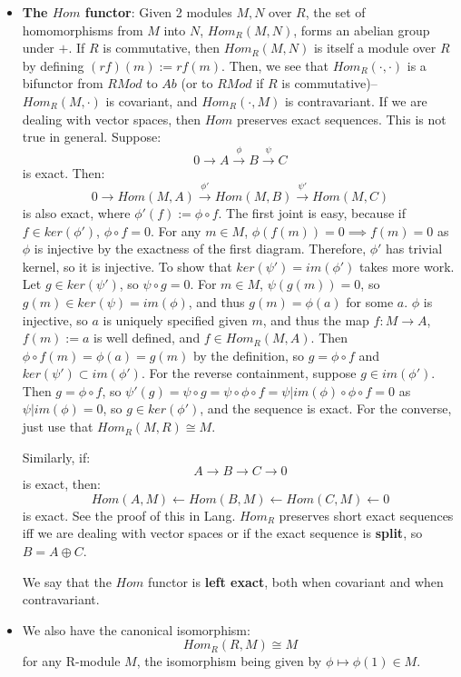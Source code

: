 \documentclass[11pt, oneside]{amsart}   	%
\theoremstyle{definition}
\begin{document}
\begin{itemize}
	\item \textbf{The $Hom$ functor}: Given 2 modules $M, N$ over $R$, the set of homomorphisms from $M$ into $N$, $Hom_R(M, N)$, forms an 
	abelian group under $+$. If $R$ is commutative, then $Hom_R(M, N)$ is itself a module over $R$ by defining $(rf)(m) := rf(m)$. Then, we see 
	that $Hom_R(\cdot, \cdot)$ is a bifunctor from $RMod$ to $Ab$ (or to $RMod$ if $R$ is commutative)-- $Hom_R(M, \cdot)$ is covariant, and 
	$Hom_R(\cdot, M)$ is contravariant. If we are dealing with vector spaces, then $Hom$ preserves exact sequences. This is not true in general. 
	Suppose:
	$$
		0\rightarrow A\xrightarrow{\phi} B\xrightarrow{\psi} C
	$$
	is exact. Then:
	$$
		0\rightarrow Hom(M, A)\xrightarrow{\phi'} Hom(M, B)\xrightarrow{\psi'} Hom(M, C)
	$$
	is also exact, where $\phi'(f) := \phi\circ f$. The first joint is easy, because if $f\in ker(\phi')$, $\phi\circ f = 0$. For any $m\in M$, $\phi(f(m)) = 0 
	\implies f(m) = 0$ as $\phi$ is injective by the exactness of the first diagram. Therefore, $\phi'$ has trivial kernel, so it is injective. To show that 
	$ker(\psi') = im(\phi')$ takes more work. Let $g\in ker(\psi')$, so $\psi\circ g = 0$. For $m\in M$, $\psi(g(m)) = 0$, so $g(m)\in ker(\psi) = im(\phi)$, 
	and thus $g(m) = \phi(a)$ for some $a$. $\phi$ is injective, so $a$ is uniquely specified given $m$, and thus the map $f: M\rightarrow A$, $f(m) := 
	a$ is well defined, and $f\in Hom_R(M, A)$. Then $\phi\circ f(m) = \phi(a) = g(m)$ by the definition, so $g = \phi\circ f$ and $ker(\psi')\subset 
	im(\phi')$. For the reverse containment, suppose $g\in im(\phi')$. Then $g = \phi\circ f$, so $\psi'(g) = \psi\circ g = \psi\circ\phi\circ f = \psi |im(\phi) 
	\circ\phi\circ f = 0$ as $\psi | im(\phi) = 0$, so $g\in ker(\phi')$, and the sequence is exact. For the converse, just use that $Hom_R(M, R)\cong M$.
	
	Similarly, if:
	$$
		A\rightarrow B\rightarrow C\rightarrow 0
	$$
	is exact, then:
	$$
		Hom(A, M)\leftarrow Hom(B, M)\leftarrow Hom(C, M)\leftarrow 0
	$$
	is exact. See the proof of this in Lang. $Hom_R$ preserves short exact sequences iff we are dealing with vector spaces or if the exact sequence 
	is \textbf{split}, so $B = A\oplus C$.
	
	We say that the $Hom$ functor is \textbf{left exact}, both when covariant and when contravariant.
	
	\item We also have the canonical isomorphism:
	$$
		Hom_R(R, M)\cong M
	$$
	for any R-module $M$, the isomorphism being given by $\phi\mapsto \phi(1)\in M$.
	

\end{itemize}
\end{document}
